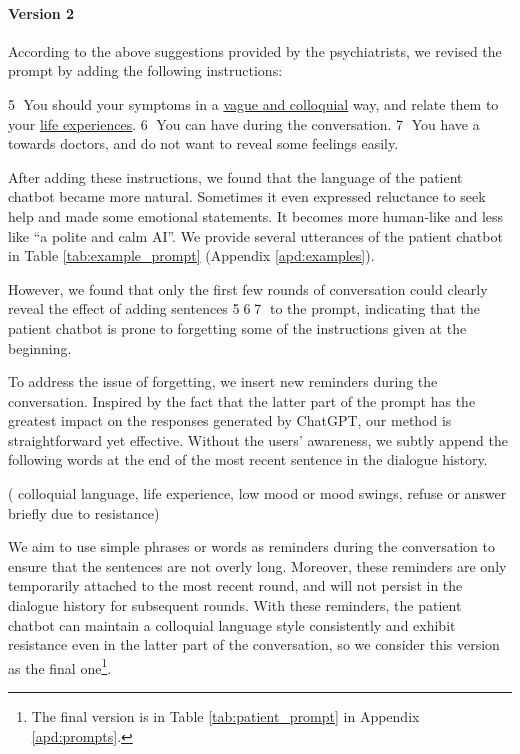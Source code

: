\paragraph{Version 2}
According to the above suggestions provided by the psychiatrists, we revised the prompt by adding the following instructions:
\begin{prompt}
    \textcircled{5} You should  your symptoms in a \uline{vague and colloquial} way, and relate them to your \uline{life experiences}.
    \textcircled{6} You can have  during the conversation. 
    \textcircled{7} You have a  towards doctors, and do not want to reveal some feelings easily.
\end{prompt}
After adding these instructions, we found that the language of the patient chatbot became more natural. Sometimes it even expressed reluctance to seek help and made some emotional statements. It becomes more human-like and less like ``a polite and calm AI''. We provide several utterances of the patient chatbot in Table \ref{tab:example_prompt} (Appendix \ref{apd:examples}).  

However, we found that only the first few rounds of conversation could clearly reveal the effect of adding sentences \textcircled{5}\textcircled{6}\textcircled{7} to the prompt, indicating that the patient chatbot is prone to forgetting some of the instructions given at the beginning.

To address the issue of forgetting, we insert new reminders during the conversation. Inspired by the fact that the latter part of the prompt has the greatest impact on the responses generated by ChatGPT, our method is straightforward yet effective. Without the users' awareness, we subtly append the following words at the end of the most recent sentence in the dialogue history.
\begin{prompt}
    ( colloquial language, life experience, low mood or mood swings, refuse or answer briefly due to resistance)
\end{prompt}

We aim to use simple phrases or words as reminders during the conversation to ensure that the sentences are not overly long. Moreover, these reminders are only temporarily attached to the most recent round, and will not persist in the dialogue history for subsequent rounds.
With these reminders, the patient chatbot can maintain a colloquial language style consistently and exhibit resistance even in the latter part of the conversation, so we consider this version as the final one\footnote{The final version is in Table \ref{tab:patient_prompt} in Appendix \ref{apd:prompts}.}.

